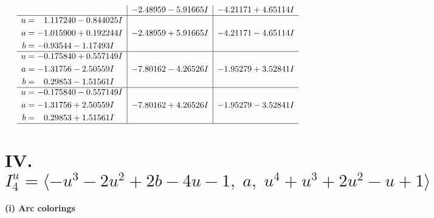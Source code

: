\documentclass[1p]{elsarticle_modified}
\theoremstyle{definition}
\begin{document}
$$\begin{array}{c|c|c}
 & -2.48959 - 5.91665 I & -4.21171 + 4.65114 I \\ \hline\begin{aligned}
u &= \phantom{-}1.117240 - 0.844025 I \\
a &= -1.015900 + 0.192244 I \\
b &= -0.93544 - 1.17493 I\end{aligned}
 & -2.48959 + 5.91665 I & -4.21171 - 4.65114 I \\ \hline\begin{aligned}
u &= -0.175840 + 0.557149 I \\
a &= -1.31756 - 2.50559 I \\
b &= \phantom{-}0.29853 - 1.51561 I\end{aligned}
 & -7.80162 - 4.26526 I & -1.95279 + 3.52841 I \\ \hline\begin{aligned}
u &= -0.175840 - 0.557149 I \\
a &= -1.31756 + 2.50559 I \\
b &= \phantom{-}0.29853 + 1.51561 I\end{aligned}
 & -7.80162 + 4.26526 I & -1.95279 - 3.52841 I\\
 \hline 
 \end{array}$$\newpage\newpage\renewcommand{\arraystretch}{1}
\centering \section*{IV. $I^u_{4}= \langle - u^3-2 u^2+2 b-4 u-1,\;a,\;u^4+u^3+2 u^2- u+1 \rangle$}
\flushleft \textbf{(i) Arc colorings}\\
\end{document}
